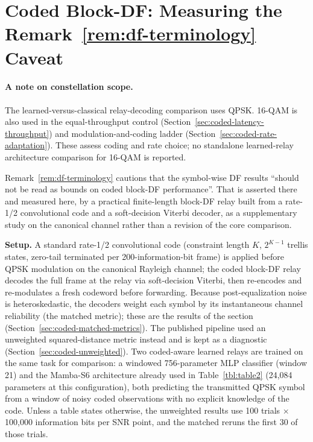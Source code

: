 \section{Coded Block-DF: Measuring the Remark~\ref{rem:df-terminology} Caveat}\label{sec:coded-block-df}

\paragraph{A note on constellation scope.} The learned-versus-classical relay-decoding comparison uses QPSK. 16-QAM is also used in the equal-throughput control (Section~\ref{sec:coded-latency-throughput}) and modulation-and-coding ladder (Section~\ref{sec:coded-rate-adaptation}). These assess coding and rate choice; no standalone learned-relay architecture comparison for 16-QAM is reported.

Remark~\ref{rem:df-terminology} cautions that the symbol-wise DF results ``should not be read as bounds on coded block-DF performance''. That is asserted there and measured here, by a practical finite-length block-DF relay built from a rate-1/2 convolutional code and a soft-decision Viterbi decoder, as a supplementary study on the canonical channel rather than a revision of the core comparison.

\textbf{Setup.} A standard rate-1/2 convolutional code (constraint length $K$, $2^{K-1}$ trellis states, zero-tail terminated per 200-information-bit frame) is applied before QPSK modulation on the canonical Rayleigh channel; the coded block-DF relay~ decodes the full frame at the relay via soft-decision Viterbi, then re-encodes and re-modulates a fresh codeword before forwarding. Because post-equalization noise is heteroskedastic, the decoders weight each symbol by its instantaneous channel reliability (the matched metric); these are the results of the section (Section~\ref{sec:coded-matched-metrics}). The published pipeline used an unweighted squared-distance metric instead and is kept as a diagnostic (Section~\ref{sec:coded-unweighted}). Two coded-aware learned relays are trained on the same task for comparison: a windowed 756-parameter MLP classifier (window 21) and the Mamba-S6 architecture already used in Table~\ref{tbl:table2} (24,084 parameters at this configuration), both predicting the transmitted QPSK symbol from a window of noisy coded observations with no explicit knowledge of the code. Unless a table states otherwise, the unweighted results use 100 trials $\times$ 100,000 information bits per SNR point, and the matched reruns the first 30 of those trials.

